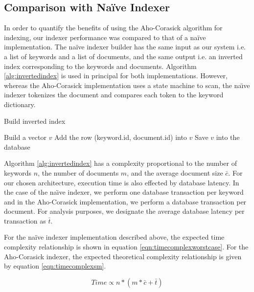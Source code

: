 \documentclass[10pt]{article}
\begin{document}
\subsection{Comparison with Na\"{i}ve Indexer}
\label{sec:naive}
In order to quantify the benefits of using the Aho-Corasick algorithm
for indexing, our indexer performance was compared to that of a
na\"{i}ve implementation. The na\"{i}ve indexer builder has the same
input as our system i.e. a list of keywords and a list of documents,
and the same output i.e. an inverted index corresponding to the
keywords and documents. Algorithm \ref{alg:invertedindex} is used in
principal for both implementations. However, whereas the Aho-Corasick
implementation uses a state machine to scan, the na\"{\i}ve
indexer tokenizes the document and compares each token to the keyword
dictionary. 


\begin{algorithm}
\caption{Build inverted index}
\label{alg:invertedindex}
\begin{algorithmic}
  \STATE Build a vector $v$
  \STATE Add the row (keyword.id, document.id) into $v$
  \ENDFOR
  \STATE Save $v$ into the database
  \ENDFOR
\end{algorithmic}
\end{algorithm}

Algorithm \ref{alg:invertedindex} has a complexity proportional to the
number of keywords $n$, the number of documents $m$, and the average
document size $\bar{c}$. For our chosen architecture, execution time
is also effected by database latency. In the case of the
na\"{\i}ve indexer, we perform one database transaction per keyword
and in the Aho-Corasick implementation, we perform a database
transaction per document. For analysis purposes, we designate the
average database latency per transaction as $\bar{t}$. 

For the na\"{i}ve indexer implementation described above, the expected
time complexity relationship is shown in equation
\ref{eqn:timecomplexworstcase}. For the Aho-Corasick indexer, the
expected theoretical complexity relationship is given by equation
\ref{eqn:timecomplexsm}.  

\begin{equation}
\label{eqn:timecomplexworstcase}
Time \propto n * ( m * \bar{c} + \bar{t} )
\end{equation}
\end{document}
